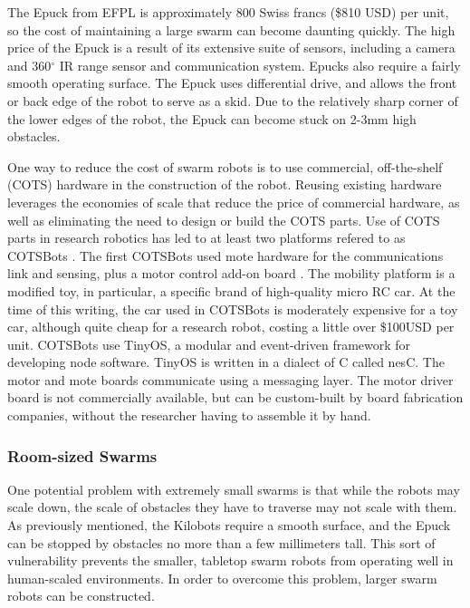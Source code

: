 \documentclass[]{article}
\begin{document}
The Epuck from EFPL is approximately 800 Swiss francs (\$810 USD) per unit, so the cost of maintaining a large swarm can become daunting quickly. 
The high price of the Epuck is a result of its extensive suite of sensors, including a camera and 360$^{\circ}$ IR range sensor and communication system. 
Epucks also require a fairly smooth operating surface.
The Epuck uses differential drive, and allows the front or back edge of the robot to serve as a skid. 
Due to the relatively sharp corner of the lower edges of the robot, the Epuck can become stuck on 2-3mm high obstacles. 

One way to reduce the cost of swarm robots is to use commercial, off-the-shelf (COTS) hardware in the construction of the robot. 
Reusing existing hardware leverages the economies of scale that reduce the price of commercial hardware, as well as eliminating the need to design or build the COTS parts. 
Use of COTS parts in research robotics has led to at least two platforms refered to as COTSBots \cite{bergbreiter2003cotsbots, soule2011cotsbots}.
The first COTSBots used mote hardware for the communications link and sensing, plus a motor control add-on board \cite{bergbreiter2003cotsbots}. 
The mobility platform is a modified toy, in particular, a specific brand of high-quality micro RC car.
At the time of this writing, the car used in COTSBots is moderately expensive for a toy car, although quite cheap for a research robot, costing a little over \$100USD per unit. 
COTSBots use TinyOS, a modular and event-driven framework  for developing node software. 
TinyOS is written in a dialect of C called nesC. The motor and mote boards communicate using a messaging layer. 
The motor driver board is not commercially available, but can be custom-built by board fabrication companies, without the researcher having to assemble it by hand. 

\subsubsection{Room-sized Swarms}

One potential problem with extremely small swarms is that while the robots may scale down, the scale of obstacles they have to traverse may not scale with them. 
As previously mentioned, the Kilobots require a smooth surface, and the Epuck can be stopped by obstacles no more than a few millimeters tall. 
This sort of vulnerability prevents the smaller, tabletop swarm robots from operating well in human-scaled environments. 
In order to overcome this problem, larger swarm robots can be constructed.
 
\end{document}
